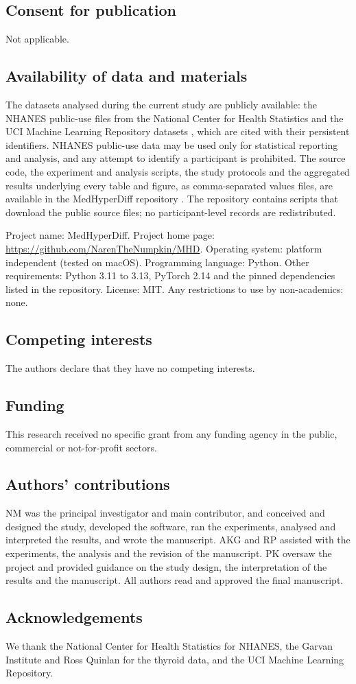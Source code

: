 \documentclass[pdflatex,referee]{sn-jnl}%
\begin{document}
\subsection*{Consent for publication}
Not applicable.

\subsection*{Availability of data and materials}
The datasets analysed during the current study are publicly available: the NHANES public-use files from the National Center for Health Statistics \cite{nhanes2011,nhanes2013,nhanes2015,nhanes2017,nhanes2021} and the UCI Machine Learning Repository datasets \cite{ilpd,heartfailure,ckd,diabetes,thyroid}, which are cited with their persistent identifiers. NHANES public-use data may be used only for statistical reporting and analysis, and any attempt to identify a participant is prohibited. The source code, the experiment and analysis scripts, the study protocols and the aggregated results underlying every table and figure, as comma-separated values files, are available in the MedHyperDiff repository \cite{code}. The repository contains scripts that download the public source files; no participant-level records are redistributed.

Project name: MedHyperDiff. Project home page: \url{https://github.com/NarenTheNumpkin/MHD}. Operating system: platform independent (tested on macOS). Programming language: Python. Other requirements: Python 3.11 to 3.13, PyTorch 2.14 and the pinned dependencies listed in the repository. License: MIT. Any restrictions to use by non-academics: none.

\subsection*{Competing interests}
The authors declare that they have no competing interests.

\subsection*{Funding}
This research received no specific grant from any funding agency in the public, commercial or not-for-profit sectors.

\subsection*{Authors' contributions}
NM was the principal investigator and main contributor, and conceived and designed the study, developed the software, ran the experiments, analysed and interpreted the results, and wrote the manuscript. AKG and RP assisted with the experiments, the analysis and the revision of the manuscript. PK oversaw the project and provided guidance on the study design, the interpretation of the results and the manuscript. All authors read and approved the final manuscript.

\subsection*{Acknowledgements}
We thank the National Center for Health Statistics for NHANES, the Garvan Institute and Ross Quinlan for the thyroid data, and the UCI Machine Learning Repository.


\end{document}
